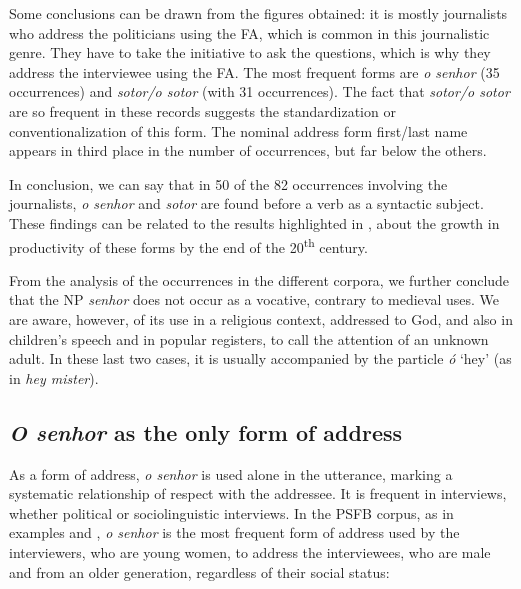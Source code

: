 \documentclass[output=paper]{langscibook}
\begin{document}
Some conclusions can be drawn from the figures obtained: it is mostly journalists who address the politicians using the FA, which is common in this journalistic genre. They have to take the initiative to ask the questions, which is why they address the interviewee using the FA. The most frequent forms are \textit{o senhor} (35 occurrences) and \textit{sotor\slash o sotor} (with 31 occurrences). The fact that \textit{sotor\slash o sotor} are so frequent in these records suggests the standardization or conventionalization of this form. The nominal address form first/last name appears in third place in the number of occurrences, but far below the others.



In conclusion, we can say that in 50 of the 82 occurrences involving the journalists, \textit{o senhor} and \textit{sotor} are found before a verb as a syntactic subject. These findings can be related to the results highlighted in \citet{Allen2019}, about the growth in productivity of these forms by the end of the 20\textsuperscript{th} century.


From the analysis of the occurrences in the different corpora, we further conclude that the NP \textit{senhor} does not occur as a vocative, contrary to medieval uses. We are aware, however, of its use in a religious context, addressed to God, and also in children’s speech and in popular registers, to call the attention of an unknown adult. In these last two cases, it is usually accompanied by the particle \textit{ó} ‘hey’ (as in \textit{hey mister}).

\subsection{\textit{O senhor} as the only form of address}\label{sec:marques:4.3}

As a form of address, \textit{o senhor} is used alone in the utterance, marking a systematic relationship of respect with the addressee. It is frequent in interviews, whether political or sociolinguistic interviews. In the PSFB corpus, as in examples  and , \textit{o senhor} is the most frequent form of address used by the interviewers, who are young women, to address the interviewees, who are male and from an older generation, regardless of their social status:
\end{document}
